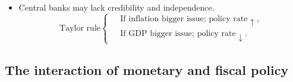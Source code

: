 \documentclass[../notes_compiled.tex]{subfiles}
\begin{document}
\begin{itemize}
\begin{enumerate}
\begin{itemize}
\item Central banks may lack credibility and independence.
\begin{equation*}
\text{Taylor rule}\begin{cases} &\text{If inflation bigger issue; policy rate $\uparrow$}, \\ & \text{If GDP bigger issue; policy rate $\downarrow$}. \end{cases}
\end{equation*}
\end{itemize}
\end{enumerate}
\end{itemize}


\subsection{The interaction of monetary and fiscal policy}
\end{document}
